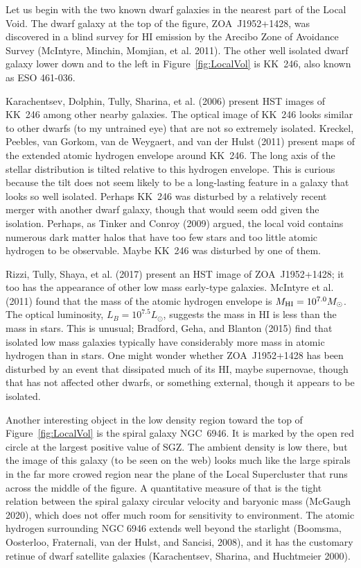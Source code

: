 \documentclass[fleqn,usenatbib]{mnras}
\begin{document}
Let us begin with the two known dwarf galaxies in the nearest part of the Local Void. The dwarf galaxy at the top of the figure, ZOA~J1952+1428, was discovered in a blind survey for HI emission by the Arecibo Zone of Avoidance Survey (McIntyre, Minchin, Momjian, et al. 2011). The other well isolated dwarf galaxy lower down and to the left in Figure~\ref{fig:LocalVol} is KK~246, also known as ESO 461-036. 

Karachentsev, Dolphin, Tully, Sharina, et al. (2006) present HST images of KK~246 among other nearby galaxies. The optical image of KK~246 looks similar to other dwarfs (to my untrained eye) that are not so extremely isolated. Kreckel, Peebles, van Gorkom, van de Weygaert, and van der Hulst (2011) present maps of the extended atomic hydrogen envelope around KK~246. The long axis of the stellar distribution is tilted relative to this hydrogen envelope. This is curious because the tilt does not seem likely to be a long-lasting feature in a galaxy that looks so well isolated. Perhaps KK~246 was disturbed by a relatively recent merger with another dwarf galaxy, though that would seem odd given the isolation. Perhaps, as Tinker and Conroy (2009) argued, the local void contains numerous dark matter halos that have too few stars and too little atomic hydrogen to be observable. Maybe KK~246 was disturbed by one of them. 

Rizzi, Tully, Shaya, et al. (2017) present an HST image of ZOA~J1952+1428; it too has the appearance of other low mass early-type galaxies. McIntyre et al. (2011) found that the mass of the atomic hydrogen envelope is $M_{\rm HI}=10^{7.0}M_\odot$. The optical luminosity, $L_B=10^{7.5}L_\odot$, suggests the mass in HI is less than the mass in stars. This is unusual; Bradford, Geha, and Blanton (2015) find that isolated low mass  galaxies typically have considerably more mass in atomic hydrogen than in stars.  One might wonder whether ZOA~J1952+1428 has been disturbed by an event that dissipated much of its HI, maybe supernovae, though that has not affected other dwarfs, or something external, though it appears to be isolated.

Another interesting object in the low density region toward the top of Figure~\ref{fig:LocalVol} is the spiral galaxy NGC~6946. It is marked by the open red circle at the largest positive value of SGZ. The ambient density is low there, but the image of this galaxy (to be seen on the web) looks much like the large spirals in the far more crowed region near the plane of the Local Supercluster that runs across the middle of the figure. A quantitative measure of that is the tight relation between the spiral galaxy circular velocity and baryonic mass (McGaugh 2020), which does not offer much room for sensitivity to environment. The atomic hydrogen surrounding NGC 6946 extends well beyond the starlight (Boomsma, Oosterloo, Fraternali, van der Hulst, and Sancisi, 2008), and it has the customary retinue of dwarf satellite galaxies (Karachentsev, Sharina, and Huchtmeier 2000). 
\end{document}
